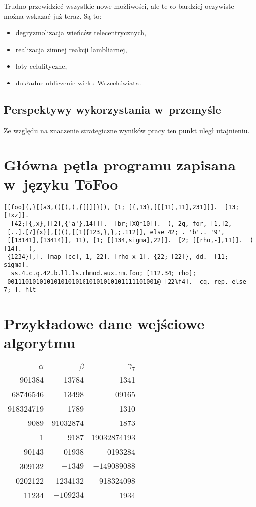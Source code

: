 \documentclass{wmiibook}
\begin{document}
Trudno przewidzieć wszystkie nowe możliwości, ale te co bardziej oczywiste można
wskazać już teraz.  Są to:
\begin{itemize}
\item degryzmolizacja wieńców telecentrycznych,
\item realizacja zimnej reakcji lambliarnej,
\item loty celulityczne,
\item dokładne obliczenie wieku Wszechświata.
\end{itemize}

\section{Perspektywy wykorzystania w~przemyśle}

Ze względu na znaczenie strategiczne wyników pracy ten punkt uległ utajnieniu.

\appendix

\chapter{Główna pętla programu zapisana w~języku T\=oFoo}

\begin{verbatim}
[[foo]{,}[[a3,(([(,),{[[]]}]), [1; [{,13},[[[11],11],231]]].  [13;[!xz]].
  [42;[{,x},[[2],{'a'},14]]].  [br;[XQ*10]].  ), 2q, for, [1,]2,
 [..].[7]{x}],[(((,[[1{{123,},},;.112]], else 42; . 'b'.. '9',
 [[13141],{13414}], 11), [1; [[134,sigma],22]].  [2; [[rho,-],11]].  )[14].  ),
 {1234}],]. [map [cc], 1, 22]. [rho x 1]. {22; [22]}, dd.  [11; sigma].
  ss.4.c.q.42.b.ll.ls.chmod.aux.rm.foo; [112.34; rho];
 001110101010101010101010101010101111101001@ [22%f4].  cq. rep. else 7; ]. hlt
\end{verbatim}

\chapter{Przykładowe dane wejściowe algorytmu}

\begin{center}
  \begin{tabular}{rrr}
    $\alpha$ & $\beta$ & $\gamma_7$ \\ 901384 & 13784 & 1341\\ 68746546 & 13498&
    09165\\ 918324719& 1789 & 1310 \\ 9089 & 91032874& 1873 \\ 1 & 9187 &
    19032874193 \\ 90143 & 01938 & 0193284 \\ 309132 & $-1349$ & $-149089088$
    \\ 0202122 & 1234132 & 918324098 \\ 11234 & $-109234$ & 1934 \\
  \end{tabular}
\end{center}
\end{document}
